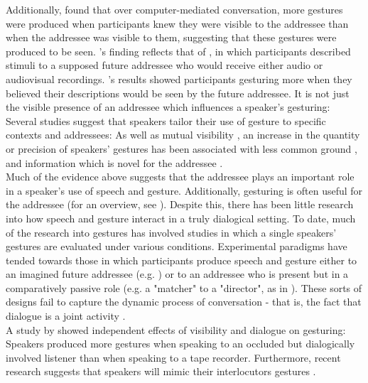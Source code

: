 \documentclass[a4paper,man,natbib]{apa6}
\begin{document}
Additionally, \citet{Mol2011} found that over computer-mediated conversation, more gestures were produced when participants knew they were visible to the addressee than when the addressee was visible to them, suggesting that these gestures were produced to be seen. 
\citeauthor{Mol2011}'s finding reflects that of \citet{Bavelas2002}, in which participants described stimuli to a supposed future addressee who would receive either audio or audiovisual recordings. \citeauthor{Bavelas2002}'s results showed participants gesturing more when they believed their descriptions would be seen by the future addressee.
It is not just the visible presence of an addressee which influences a speaker's gesturing: Several studies suggest that speakers tailor their use of gesture to specific contexts and addressees:
As well as mutual visibility \citep{Alibali2001, Cohen1973, Hoetjes2015}, an increase in the quantity or precision of speakers' gestures has been associated with less common ground \citep{Gerwing2004, Holler2007}, and information which is novel for the addressee \citep{Jacobs2007}.\\


Much of the evidence above suggests that the addressee plays an important role in a speaker's use of speech and gesture.
Additionally, gesturing is often useful for the addressee (for an overview, see \citet{Hostetter2011}). 
Despite this, there has been little research into how speech and gesture interact in a truly dialogical setting.
To date, much of the research into gestures has involved studies in which a single speakers' gestures are evaluated under various conditions.
Experimental paradigms have tended towards those in which participants produce speech and gesture either to an imagined future addressee (e.g. \citet{Wesp2001, Morsella2004}) or to an addressee who is present but in a comparatively passive role (e.g. a "matcher" to a "director", as in \citet{Bangerter2004, Holler2007, DeRuiter2012, Hoetjes2015}).
These sorts of designs fail to capture the dynamic process of conversation - that is, the fact that dialogue is a joint activity \citep{Clark1996}.\\

A study by \citeauthor{Bavelas2008} showed independent effects of visibility and dialogue on gesturing:
Speakers produced more gestures when speaking to an occluded but dialogically involved listener than when speaking to a tape recorder. 
Furthermore, recent research suggests that speakers will mimic their interlocutors gestures \citep{Kimbara2008, Holler2011}. %
\end{document}
